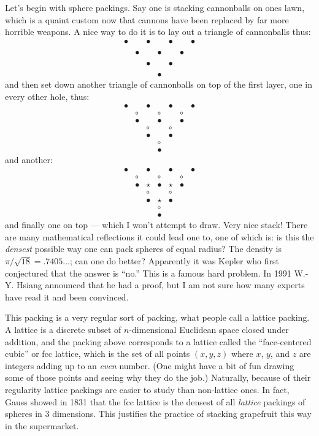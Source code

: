 \documentclass{article}
\begin{document}
Let's begin with sphere packings. Say one is stacking cannonballs on
ones lawn, which is a quaint custom now that cannons have been replaced
by far more horrible weapons. A nice way to do it is to lay out a
triangle of cannonballs thus: \[
  \begin{array}{ccccccc}
    \bullet&&\bullet&&\bullet&&\bullet
  \\
  \\&\bullet&&\bullet&&\bullet&
  \\
  \\&&\bullet&&\bullet&&
  \\
  \\&&&\bullet&&&
  \end{array}
\] and then set down another triangle of cannonballs on top of the first
layer, one in every other hole, thus: \[
  \begin{array}{ccccccc}
    \bullet&&\bullet&&\bullet&&\bullet
  \\&\circ&&\circ&&\circ&
  \\&\bullet&&\bullet&&\bullet&
  \\&&\circ&&\circ&&
  \\&&\bullet&&\bullet&&
  \\&&&\circ&&&
  \\&&&\bullet&&&
  \end{array}
\] and another: \[
  \begin{array}{ccccccc}
    \bullet&&\bullet&&\bullet&&\bullet
  \\&\circ&&\circ&&\circ&
  \\&\bullet&\star&\bullet&\star&\bullet&
  \\&&\circ&&\circ&&
  \\&&\bullet&\star&\bullet&&
  \\&&&\circ&&&
  \\&&&\bullet&&&
  \end{array}
\] and finally one on top --- which I won't attempt to draw. Very nice
stack! There are many mathematical reflections it could lead one to, one
of which is: is this the \emph{densest} possible way one can pack
spheres of equal radius? The density is \(\pi/\sqrt{18} = .7405\ldots\);
can one do better? Apparently it was Kepler who first conjectured that
the answer is ``no.'' This is a famous hard problem. In 1991 W.-Y.
Hsiang announced that he had a proof, but I am not sure how many experts
have read it and been convinced.

This packing is a very regular sort of packing, what people call a
lattice packing. A lattice is a discrete subset of \(n\)-dimensional
Euclidean space closed under addition, and the packing above corresponds
to a lattice called the ``face-centered cubic'' or fcc lattice, which is
the set of all points \((x,y,z)\) where \(x\), \(y\), and \(z\) are
integers adding up to an \emph{even} number. (One might have a bit of
fun drawing some of those points and seeing why they do the job.)
Naturally, because of their regularity lattice packings are easier to
study than non-lattice ones. In fact, Gauss showed in 1831 that the fcc
lattice is the densest of all \emph{lattice} packings of spheres in 3
dimensions. This justifies the practice of stacking grapefruit this way
in the supermarket.
\end{document}
